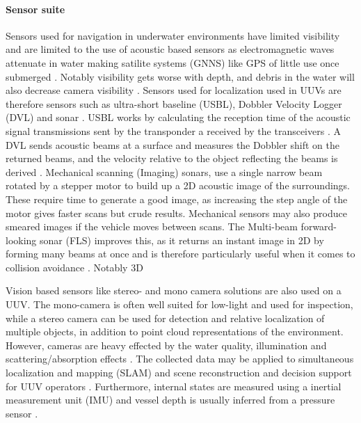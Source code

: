 \paragraph{Sensor suite}
Sensors used for navigation in underwater environments have limited visibility and are limited to the use of acoustic based sensors as electromagnetic waves attenuate in water making satilite systems (GNNS) like GPS of little use once submerged \parencite{bogue2015underwater, haugalokken2024lowcost}. Notably visibility gets worse with depth, and debris in the water will also decrease camera visibility \parencite{evjemo2025aquaculture}. Sensors used for localization used in UUVs are therefore sensors such as ultra-short baseline (USBL), Dobbler Velocity Logger (DVL) and sonar \parencite{evjemo2025aquaculture}. USBL works by calculating the reception time of the acoustic signal transmissions sent by the transponder a received by the transceivers \parencite{evjemo2025aquaculture}. A DVL sends acoustic beams at a surface and measures the Dobbler shift on the returned beams, and the velocity relative to the object reflecting the beams is derived \parencite{evjemo2025aquaculture}. Mechanical scanning (Imaging) sonars, use a single narrow beam rotated by a stepper motor to build up a 2D acoustic image of the surroundings. These require time to generate a good image, as increasing the step angle of the motor gives faster scans but crude results. Mechanical sensors may also produce smeared images if the vehicle moves between scans. The Multi-beam forward-looking sonar (FLS) improves this, as it returns an instant image in 2D by forming many beams at once and is therefore particularly useful when it comes to collision avoidance \parencite{bogue2015underwater}. Notably 3D 

Vision based sensors like stereo- and mono camera solutions are also used on a UUV. The mono-camera is often well suited for low-light and used for inspection, while a stereo camera can be used for detection and relative localization of multiple objects, in addition to point cloud representations of the environment. However, cameras are heavy effected by the water quality, illumination and scattering/absorption effects \parencite{haugalokken2024lowcost}. The collected data may be applied to simultaneous localization and mapping (SLAM) and scene reconstruction and decision support for UUV operators \parencite{haugalokken2024lowcost}. Furthermore, internal states are measured using a inertial measurement unit (IMU) and vessel depth is usually inferred from a pressure sensor \parencite{evjemo2025aquaculture}.

